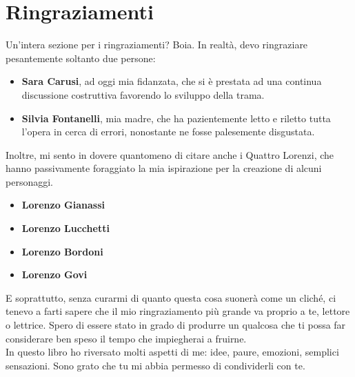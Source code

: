 \documentclass[12pt]{book}
\begin{document}
\section*{Ringraziamenti}

Un'intera sezione per i ringraziamenti? Boia. In realtà, devo ringraziare pesantemente soltanto due persone:

\begin{itemize}
	\item \textbf{Sara Carusi}, ad oggi mia fidanzata, che si è prestata ad una continua discussione costruttiva favorendo lo sviluppo della trama.
	\item \textbf{Silvia Fontanelli}, mia madre, che ha pazientemente letto e riletto tutta l'opera in cerca di errori, nonostante ne fosse palesemente disgustata.
\end{itemize}

Inoltre, mi sento in dovere quantomeno di citare anche i Quattro Lorenzi, che hanno passivamente foraggiato la mia ispirazione per la creazione di alcuni personaggi.

\begin{itemize}
	\item \textbf{Lorenzo Gianassi}
	\item \textbf{Lorenzo Lucchetti}
	\item \textbf{Lorenzo Bordoni}
	\item \textbf{Lorenzo Govi}
\end{itemize}

E soprattutto, senza curarmi di quanto questa cosa suonerà come un cliché, ci tenevo a farti sapere che il mio ringraziamento più grande va proprio a te, lettore o lettrice. Spero di essere stato in grado di produrre un qualcosa che ti possa far considerare ben speso il tempo che impiegherai a fruirne. \\

In questo libro ho riversato molti aspetti di me: idee, paure, emozioni, semplici sensazioni. Sono grato che tu mi abbia permesso di condividerli con te. \\

\newpage
\tableofcontents
\newpage


































\end{document}
